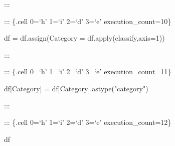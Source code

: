 \documentclass[
  letterpaper,
  DIV=11,
  numbers=noendperiod]{scrreport}
\newenvironment{Shaded}{\begin{snugshade}}{\end{snugshade}}
\newcommand{\BuiltInTok}[1]{\textcolor[rgb]{0.00,0.23,0.31}{#1}}
\newcommand{\DecValTok}[1]{\textcolor[rgb]{0.68,0.00,0.00}{#1}}
\newcommand{\NormalTok}[1]{\textcolor[rgb]{0.00,0.23,0.31}{#1}}
\newcommand{\OperatorTok}[1]{\textcolor[rgb]{0.37,0.37,0.37}{#1}}
\newcommand{\StringTok}[1]{\textcolor[rgb]{0.13,0.47,0.30}{#1}}
\begin{document}
:::

::: \{.cell 0=`h' 1=`i' 2=`d' 3=`e' execution\_count=10\}

\begin{Shaded}
\begin{Highlighting}[]
\NormalTok{df }\OperatorTok{=}\NormalTok{ df.assign(Category }\OperatorTok{=}\NormalTok{ df.}\BuiltInTok{apply}\NormalTok{(classify,axis}\OperatorTok{=}\DecValTok{1}\NormalTok{))}
\end{Highlighting}
\end{Shaded}

:::

::: \{.cell 0=`h' 1=`i' 2=`d' 3=`e' execution\_count=11\}

\begin{Shaded}
\begin{Highlighting}[]
\NormalTok{df[}\StringTok{\textquotesingle{}Category\textquotesingle{}}\NormalTok{] }\OperatorTok{=}\NormalTok{ df[}\StringTok{\textquotesingle{}Category\textquotesingle{}}\NormalTok{].astype(}\StringTok{"category"}\NormalTok{)}
\end{Highlighting}
\end{Shaded}

:::

::: \{.cell 0=`h' 1=`i' 2=`d' 3=`e' execution\_count=12\}

\begin{Shaded}
\begin{Highlighting}[]
\NormalTok{df}
\end{Highlighting}
\end{Shaded}
\end{document}
